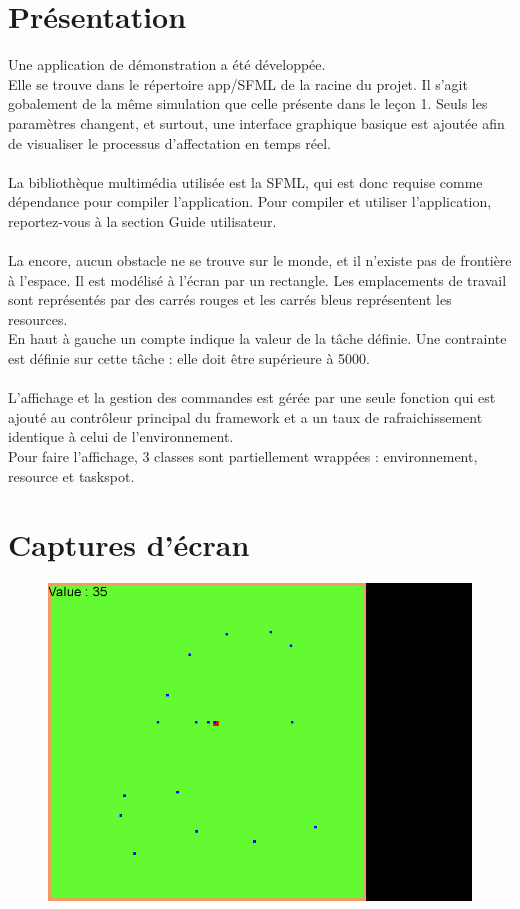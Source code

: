 \section{Présentation}
Une application de démonstration a été développée.\\
Elle se trouve dans le répertoire app/SFML de la racine du projet. Il s'agit gobalement de la même simulation que celle présente dans le leçon 1. Seuls les paramètres changent, et surtout, une interface graphique basique est ajoutée afin de visualiser le processus d'affectation en temps réel.\\\\

La bibliothèque multimédia utilisée est la SFML, qui est donc requise comme dépendance pour compiler l'application. Pour compiler et utiliser l'application, reportez-vous à la section Guide utilisateur.\\\\

La encore, aucun obstacle ne se trouve sur le monde, et il n'existe pas de frontière à l'espace. Il est modélisé à l'écran par un rectangle. Les emplacements de travail sont représentés par des carrés rouges et les carrés bleus représentent les resources.\\
En haut à gauche un compte indique la valeur de la tâche définie. Une contrainte est définie sur cette tâche : elle doit être supérieure à 5000.\\\\

L'affichage et la gestion des commandes est gérée par une seule fonction qui est ajouté au contrôleur principal du framework et a un taux de rafraichissement identique à celui de l'environnement.\\
Pour faire l'affichage, 3 classes sont partiellement wrappées : environnement, resource et taskspot.

\section{Captures d'écran}

\begin{figure}[!h]\centering
    \includegraphics[scale=0.5]{screens/1.png}
\end{figure}

